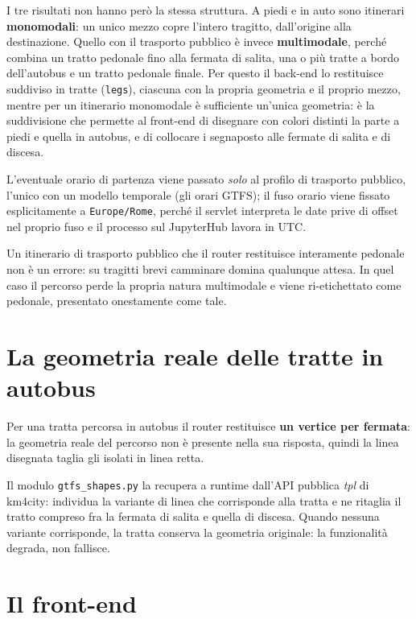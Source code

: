 \documentclass[a4paper,oneside]{Tptesi2}
\begin{document}
I tre risultati non hanno per\`o la stessa struttura. A piedi e in auto sono itinerari
\textbf{monomodali}: un unico mezzo copre l'intero tragitto, dall'origine alla
destinazione. Quello con il trasporto pubblico \`e invece \textbf{multimodale}, perch\'e
combina un tratto pedonale fino alla fermata di salita, una o pi\`u tratte a bordo
dell'autobus e un tratto pedonale finale. Per questo il back-end lo restituisce
suddiviso in tratte (\texttt{legs}), ciascuna con la propria geometria e il proprio
mezzo, mentre per un itinerario monomodale \`e sufficiente un'unica geometria: \`e la
suddivisione che permette al front-end di disegnare con colori distinti la parte a piedi
e quella in autobus, e di collocare i segnaposto alle fermate di salita e di discesa.

L'eventuale orario di partenza viene passato \emph{solo} al profilo di trasporto
pubblico, l'unico con un modello temporale (gli orari GTFS); il fuso orario viene
fissato esplicitamente a \texttt{Europe/Rome}, perch\'e il servlet interpreta le date
prive di offset nel proprio fuso e il processo sul JupyterHub lavora in UTC.

Un itinerario di trasporto pubblico che il router restituisce interamente pedonale non
\`e un errore: su tragitti brevi camminare domina qualunque attesa. In quel caso il
percorso perde la propria natura multimodale e viene ri-etichettato come pedonale,
presentato onestamente come tale.

\section{La geometria reale delle tratte in autobus}

Per una tratta percorsa in autobus il router restituisce \textbf{un vertice per fermata}:
la geometria reale del percorso non \`e presente nella sua risposta, quindi la linea
disegnata taglia gli isolati in linea retta.

Il modulo \texttt{gtfs\_shapes.py} la recupera a runtime dall'API pubblica \emph{tpl} di
km4city: individua la variante di linea che corrisponde alla tratta e ne ritaglia il tratto
compreso fra la fermata di salita e quella di discesa. Quando nessuna variante corrisponde,
la tratta conserva la geometria originale: la funzionalit\`a degrada, non fallisce.

\section{Il front-end}
\end{document}
